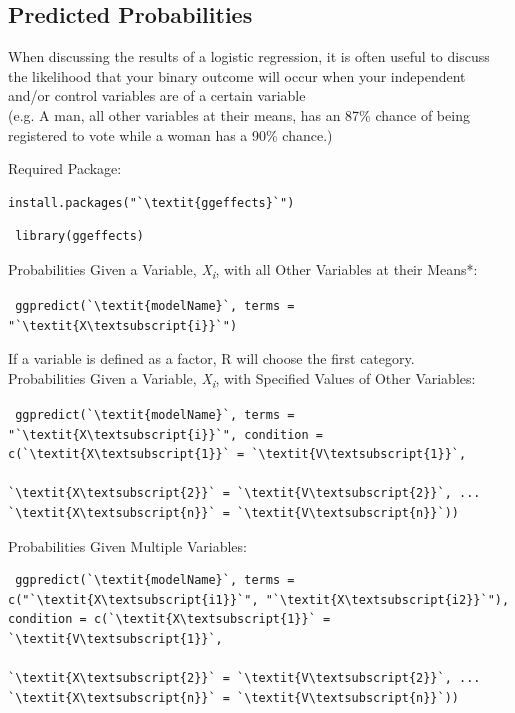 \documentclass[12pt,letterpaper]{article}
\begin{document}
\subsection{Predicted Probabilities}
 When discussing the results of a logistic regression, it is often useful to discuss the likelihood that your binary outcome will occur when your independent and/or control variables are of a certain variable \\
 (e.g. A man, all other variables at their means, has an 87\% chance of being registered to vote while a woman has a 90\% chance.) \vspace{.5em}
\\
\begin{tcolorbox}[title = Predicted Probabilities]
Required Package:
\begin{lstlisting}[frameround = t t t t, backgroundcolor = \color{lightgray}]
  install.packages("`\textit{ggeffects}`")
\end{lstlisting}
\begin{lstlisting}
 library(ggeffects)
\end{lstlisting}
Probabilities Given a Variable, \textit{X\textsubscript{i}}, with all Other Variables at their Means*:
\begin{lstlisting}
 ggpredict(`\textit{modelName}`, terms = "`\textit{X\textsubscript{i}}`")
\end{lstlisting}{\small * If a variable is defined as a factor, R will choose the first category.} \vspace{.5em}\\
Probabilities Given a Variable, \textit{X\textsubscript{i}}, with Specified Values of Other Variables:
\begin{lstlisting}
 ggpredict(`\textit{modelName}`, terms = "`\textit{X\textsubscript{i}}`", condition = c(`\textit{X\textsubscript{1}}` = `\textit{V\textsubscript{1}}`, 
                                             `\textit{X\textsubscript{2}}` = `\textit{V\textsubscript{2}}`, ... `\textit{X\textsubscript{n}}` = `\textit{V\textsubscript{n}}`))
\end{lstlisting}
Probabilities Given Multiple Variables:
\begin{lstlisting}
 ggpredict(`\textit{modelName}`, terms = c("`\textit{X\textsubscript{i1}}`", "`\textit{X\textsubscript{i2}}`"), condition = c(`\textit{X\textsubscript{1}}` = `\textit{V\textsubscript{1}}`, 
                                             `\textit{X\textsubscript{2}}` = `\textit{V\textsubscript{2}}`, ... `\textit{X\textsubscript{n}}` = `\textit{V\textsubscript{n}}`))

\end{lstlisting}
\end{tcolorbox}
\end{document}

